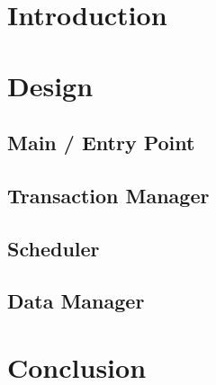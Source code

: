 \documentclass[12pt]{article}
\begin{document}
 \maketitle

\section{Introduction} 

\section{Design}

\subsection{Main / Entry Point}

\subsection{ Transaction Manager }

\subsection{Scheduler}

\subsection{Data Manager}

\section{Conclusion}
\end{document}
